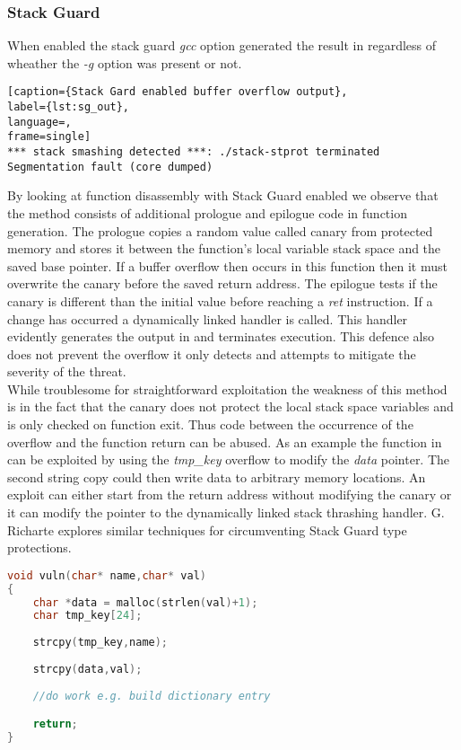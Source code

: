 \subsubsection {Stack Guard}
When enabled the stack guard \emph{gcc} option generated the result in  regardless of wheather the \emph{-g} option was present or not. 
\begin{lstlisting}[caption={Stack Gard enabled buffer overflow output},
label={lst:sg_out},
language=,
frame=single]
*** stack smashing detected ***: ./stack-stprot terminated
Segmentation fault (core dumped)
\end{lstlisting}
By looking at function disassembly with Stack Guard enabled we observe that the method consists of additional prologue and epilogue code in function generation. The prologue copies a random value called canary from protected memory and stores it between the function's local variable stack space and the saved base pointer. If a buffer overflow then occurs in this function then it must overwrite the canary before the saved return address. The epilogue tests if the canary is different than the initial value before reaching a \emph{ret} instruction. If a change has occurred  a dynamically linked handler is called. This handler evidently generates the output in  and terminates execution. This defence also does not prevent the overflow it only detects and attempts to mitigate the severity of the threat.\\
While troublesome for straightforward exploitation the weakness of this method is in the fact that the canary does not protect the local stack space variables and is only checked on function exit. Thus code between the occurrence of the overflow and the function return can be abused. As an example the function in  can be exploited by using the \emph{tmp\_key} overflow to modify the \emph{data} pointer. The second string copy could then write data to arbitrary memory locations. An exploit can either start from the return address without modifying the canary or it can modify the pointer to the dynamically linked stack thrashing handler. G. Richarte\cite{Stackgua58} explores similar techniques for circumventing Stack Guard type protections.

\begin{lstlisting}[caption={Stack Gard vulnerable function},
label={lst:sg_example},
language=C,
frame=single]
void vuln(char* name,char* val)
{
    char *data = malloc(strlen(val)+1);
    char tmp_key[24];
    
    strcpy(tmp_key,name);
    
    strcpy(data,val);
    
    //do work e.g. build dictionary entry

    return;
}
\end{lstlisting}
